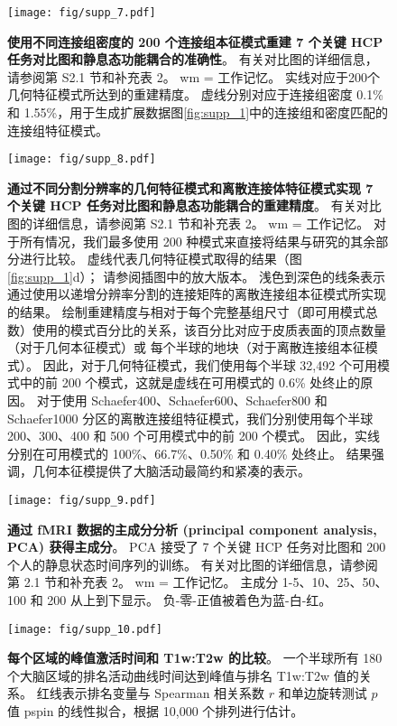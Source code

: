 \documentclass[lang=cn,a4paper,newtx]{elegantpaper}
\begin{document}
\begin{figure}[!htb] 
	\centering
	\texttt{[image: fig/supp\_7.pdf]}
	\caption{
		\textbf{使用不同连接组密度的 200 个连接组本征模式重建 7 个关键 HCP 任务对比图和静息态功能耦合的准确性}。
		有关对比图的详细信息，请参阅第 S2.1 节和补充表 2。
		wm = 工作记忆。
		实线对应于200个几何特征模式所达到的重建精度。
		虚线分别对应于连接组密度 0.1\% 和 1.55\%，用于生成扩展数据图\ref{fig:supp_1}中的连接组和密度匹配的连接组特征模式。
	} \label{fig:supp_7}
\end{figure}


\begin{figure}[!htb] 
	\centering
	\texttt{[image: fig/supp\_8.pdf]}
	\caption{
	\textbf{通过不同分割分辨率的几何特征模式和离散连接体特征模式实现 7 个关键 HCP 任务对比图和静息态功能耦合的重建精度}。
	有关对比图的详细信息，请参阅第 S2.1 节和补充表 2。 wm = 工作记忆。
	对于所有情况，我们最多使用 200 种模式来直接将结果与研究的其余部分进行比较。
	虚线代表几何特征模式取得的结果（图\ref{fig:supp_1}d）；
	请参阅插图中的放大版本。
	浅色到深色的线条表示通过使用以递增分辨率分割的连接矩阵的离散连接组本征模式所实现的结果。
	绘制重建精度与相对于每个完整基组尺寸（即可用模式总数）使用的模式百分比的关系，该百分比对应于皮质表面的顶点数量（对于几何本征模式）或 每个半球的地块（对于离散连接组本征模式）。
	因此，对于几何特征模式，我们使用每个半球 32,492 个可用模式中的前 200 个模式，这就是虚线在可用模式的 0.6\% 处终止的原因。
	对于使用 Schaefer400、Schaefer600、Schaefer800 和 Schaefer1000 分区的离散连接组特征模式，我们分别使用每个半球 200、300、400 和 500 个可用模式中的前 200 个模式。
	因此，实线分别在可用模式的 100\%、66.7\%、0.50\% 和 0.40\% 处终止。
	结果强调，几何本征模提供了大脑活动最简约和紧凑的表示。
	} \label{fig:supp_8}
\end{figure}



\begin{figure}[!htb] 
	\centering
	\texttt{[image: fig/supp\_9.pdf]}
	\caption{
		\textbf{通过 fMRI 数据的主成分分析 (principal component analysis, PCA) 获得主成分}。
		PCA 接受了 7 个关键 HCP 任务对比图和 200 个人的静息状态时间序列的训练。
		有关对比图的详细信息，请参阅第 2.1 节和补充表 2。
		wm = 工作记忆。
		主成分 1-5、10、25、50、100 和 200 从上到下显示。
		负-零-正值被着色为蓝-白-红。
	} \label{fig:supp_9}
\end{figure}


\begin{figure}[!htb] 
	\centering
	\texttt{[image: fig/supp\_10.pdf]}
	\caption{
		\textbf{每个区域的峰值激活时间和 T1w:T2w 的比较}。
		一个半球所有 180 个大脑区域的排名活动曲线时间达到峰值与排名 T1w:T2w 值的关系。
		红线表示排名变量与 Spearman 相关系数 $ r $ 和单边旋转测试 $ p $ 值 pspin 的线性拟合，根据 10,000 个排列进行估计。
	} \label{fig:supp_10}
\end{figure}














\nocite{*}
\printbibliography[heading=bibintoc, title=\ebibname]

\appendix
\addappheadtotoc
\end{document}
